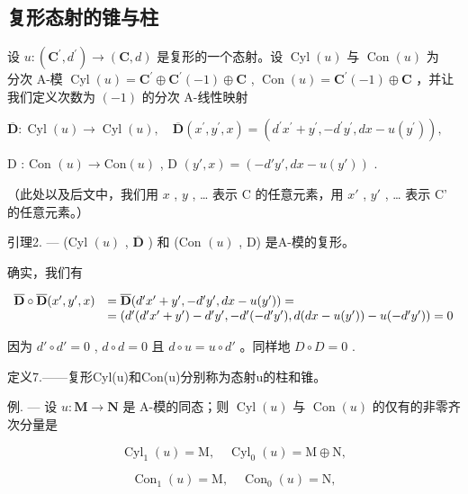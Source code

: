 \subsection{复形态射的锥与柱}

设 \(u:(\mathbf{C}^{\prime},d^{\prime})\to(\mathbf{C},d)\) 是复形的一个态射。设 \(\operatorname{Cyl}(u)\) 与 \(\operatorname{Con}(u)\) 为 \(\text{分次 A-模 }\operatorname{Cyl}(u)=\mathbf{C}^{\prime}\oplus\mathbf{C}^{\prime}(-1)\oplus\mathbf{C}\) , \(\operatorname{Con}(u)=\mathbf{C}^{\prime}(-1)\oplus\mathbf{C}\) ，并让我们定义次数为 \((-1)\) 的分次 A-线性映射

\(\overline{\mathbf{D}}:\operatorname {Cyl}(u)\to \operatorname {Cyl}(u),\quad \overline{\mathbf{D}} (x^{\prime},y^{\prime},x) = (d^{\prime}x^{\prime} + y^{\prime}, - d^{\prime}y^{\prime},dx - u(y^{\prime})),\)

D : Con \((u) \to \text{Con}(u)\) , D \((y', x) = (-d'y', dx - u(y'))\) .

（此处以及后文中，我们用 \(x\) , \(y\) , \ldots{} 表示 C 的任意元素，用 \(x'\) , \(y'\) , \ldots{} 表示 C' 的任意元素。）

引理2. --- (Cyl \((u)\) , \(\overline{\mathbf{D}}\) ) 和 (Con \((u)\) , D) 是A-模的复形。

确实，我们有

\[
\begin{array}{r l} \overline {{\mathbf {D}}} \circ \overline {{\mathbf {D}}} (x ^ {\prime}, y ^ {\prime}, x) & = \overline {{\mathbf {D}}} (d ^ {\prime} x ^ {\prime} + y ^ {\prime}, - d ^ {\prime} y ^ {\prime}, d x - u (y ^ {\prime})) = \\ & = (d ^ {\prime} (d ^ {\prime} x ^ {\prime} + y ^ {\prime}) - d ^ {\prime} y ^ {\prime}, - d ^ {\prime} (- d ^ {\prime} y ^ {\prime}), d (d x - u (y ^ {\prime})) - u (- d ^ {\prime} y ^ {\prime})) = 0 \end{array}
\]

因为 \(d' \circ d' = 0\) , \(d \circ d = 0\) 且 \(d \circ u = u \circ d'\) 。同样地 \(D \circ D = 0\) .

定义7.——复形Cyl(u)和Con(u)分别称为态射u的柱和锥。

例. --- 设 \(u: \mathbf{M} \to \mathbf{N}\) 是 A-模的同态；则 \(\operatorname{Cyl}(u)\) 与 \(\operatorname{Con}(u)\) 的仅有的非零齐次分量是

\[
\operatorname{Cyl} _ {1} (u) = \mathrm{M}, \quad \operatorname{Cyl} _ {0} (u) = \mathrm{M} \oplus \mathrm{N},
\]

\[
\operatorname{Con} _ {1} (u) = \mathrm{M}, \quad \operatorname{Con} _ {0} (u) = \mathrm{N},
\]

